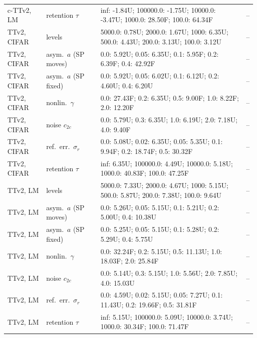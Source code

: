 \begin{table}[t]
\begin{tabular}{llp{8.8cm}l}
c-TTv2, LM & retention $\tau$ & inf: -1.84U; 100000.0: -1.75U; 10000.0: -3.47U; 1000.0: 28.50F; 100.0: 64.34F & --\\
TTv2, CIFAR & levels & 5000.0: 0.78U; 2000.0: 1.67U; 1000: 6.35U; 500.0: 4.43U; 200.0: 3.13U; 100.0: 3.12U & --\\
TTv2, CIFAR & asym.\ $a$ (SP moves) & 0.0: 5.92U; 0.05: 6.35U; 0.1: 5.95F; 0.2: 6.39F; 0.4: 42.92F & --\\
TTv2, CIFAR & asym.\ $a$ (SP fixed) & 0.0: 5.92U; 0.05: 6.02U; 0.1: 6.12U; 0.2: 4.60U; 0.4: 6.20U & --\\
TTv2, CIFAR & nonlin.\ $\gamma$ & 0.0: 27.43F; 0.2: 6.35U; 0.5: 9.00F; 1.0: 8.22F; 2.0: 12.20F & --\\
TTv2, CIFAR & noise $c_{2c}$ & 0.0: 5.79U; 0.3: 6.35U; 1.0: 6.19U; 2.0: 7.18U; 4.0: 9.40F & --\\
TTv2, CIFAR & ref.\ err.\ $\sigma_r$ & 0.0: 5.08U; 0.02: 6.35U; 0.05: 5.35U; 0.1: 9.94F; 0.2: 18.74F; 0.5: 30.32F & --\\
TTv2, CIFAR & retention $\tau$ & inf: 6.35U; 100000.0: 4.49U; 10000.0: 5.18U; 1000.0: 40.83F; 100.0: 47.25F & --\\
TTv2, LM & levels & 5000.0: 7.33U; 2000.0: 4.67U; 1000: 5.15U; 500.0: 5.87U; 200.0: 7.38U; 100.0: 9.64U & --\\
TTv2, LM & asym.\ $a$ (SP moves) & 0.0: 5.26U; 0.05: 5.15U; 0.1: 5.21U; 0.2: 5.00U; 0.4: 10.38U & --\\
TTv2, LM & asym.\ $a$ (SP fixed) & 0.0: 5.25U; 0.05: 5.15U; 0.1: 5.28U; 0.2: 5.29U; 0.4: 5.75U & --\\
TTv2, LM & nonlin.\ $\gamma$ & 0.0: 32.24F; 0.2: 5.15U; 0.5: 11.13U; 1.0: 18.03F; 2.0: 25.84F & --\\
TTv2, LM & noise $c_{2c}$ & 0.0: 5.14U; 0.3: 5.15U; 1.0: 5.56U; 2.0: 7.85U; 4.0: 15.03U & --\\
TTv2, LM & ref.\ err.\ $\sigma_r$ & 0.0: 4.59U; 0.02: 5.15U; 0.05: 7.27U; 0.1: 11.43U; 0.2: 19.66F; 0.5: 31.81F & --\\
TTv2, LM & retention $\tau$ & inf: 5.15U; 100000.0: 5.09U; 10000.0: 3.74U; 1000.0: 30.34F; 100.0: 71.47F & --\\
\bottomrule\end{tabular}\end{table}
